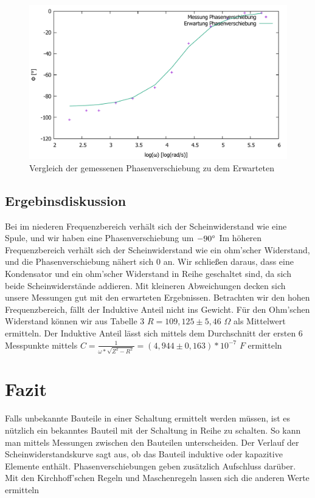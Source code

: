 \documentclass{scrartcl}
\begin{document}
\begin{figure}[H]
  \centering
    \includegraphics[width=\textwidth]{logo_.pdf}
  \caption{Vergleich der gemessenen Phasenverschiebung zu dem Erwarteten}
  \label{fig:Aufbau_Foto}
\end{figure}
\subsection{Ergebinsdiskussion}
Bei im niederen Frequenzbereich verhält sich der Scheinwiderstand wie eine Spule, und
wir haben eine Phasenverschiebung um $-90\degree$ Im höheren Frequenzbereich verhält sich
der Scheinwiderstand wie ein ohm’scher Widerstand, und die Phasenverschiebung nähert
sich 0 an. Wir schließen daraus, dass eine Kondensator und ein ohm’scher Widerstand in Reihe
geschaltet sind, da sich beide Scheinwiderstände addieren.
Mit kleineren Abweichungen decken sich unsere Messungen gut mit den erwarteten Ergebnissen. Betrachten wir den hohen Frequenzbereich, fällt der Induktive Anteil nicht
ins Gewicht. Für den Ohm’schen Widerstand können wir aus Tabelle 3 $R = 109,125 \pm 5,46$ $\Omega$
als Mittelwert ermitteln. Der Induktive Anteil lässt sich mittels dem Durchschnitt der ersten 6 Messpunkte mittels $C = \frac{1}{\omega * \sqrt{Z^2 - R^2}} = (4,944 \pm 0,163 )*10^{-7}$ $F$ ermitteln

\section{Fazit}
Falls unbekannte Bauteile in einer Schaltung ermittelt werden müssen, ist es nützlich ein
bekanntes Bauteil mit der Schaltung in Reihe zu schalten. So kann man mittels Messungen zwischen den Bauteilen unterscheiden. Der Verlauf der Scheinwiderstandskurve sagt
aus, ob das Bauteil induktive oder kapazitive Elemente enthält. Phasenverschiebungen
geben zusätzlich Aufschluss darüber. Mit den Kirchhoff’schen Regeln und Maschenregeln
lassen sich die anderen Werte ermitteln
\end{document}
